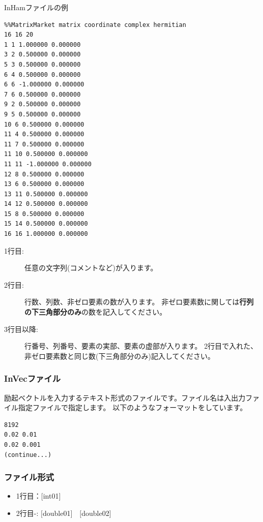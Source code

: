 \documentclass[12pt,titlepage]{jarticle}
\begin{document}
InHamファイルの例

\begin{minipage}{15cm}
  \begin{screen}
\begin{verbatim}
%%MatrixMarket matrix coordinate complex hermitian
16 16 20 
1 1 1.000000 0.000000
3 2 0.500000 0.000000
5 3 0.500000 0.000000
6 4 0.500000 0.000000
6 6 -1.000000 0.000000
7 6 0.500000 0.000000
9 2 0.500000 0.000000
9 5 0.500000 0.000000
10 6 0.500000 0.000000
11 4 0.500000 0.000000
11 7 0.500000 0.000000
11 10 0.500000 0.000000
11 11 -1.000000 0.000000
12 8 0.500000 0.000000
13 6 0.500000 0.000000
13 11 0.500000 0.000000
14 12 0.500000 0.000000
15 8 0.500000 0.000000
15 14 0.500000 0.000000
16 16 1.000000 0.000000
\end{verbatim}
  \end{screen}
\end{minipage}

\begin{description}
\item[1行目:] 任意の文字列(コメントなど)が入ります。
\item[2行目:] 行数、列数、非ゼロ要素の数が入ります。
  非ゼロ要素数に関しては{\bf 行列の下三角部分のみ}の数を記入してください。
\item[3行目以降:] 行番号、列番号、要素の実部、要素の虚部が入ります。
  2行目で入れた、非ゼロ要素数と同じ数(下三角部分のみ)記入してください。
\end{description}

\subsubsection{InVecファイル}\label{subsubsec:vec}
励起ベクトルを入力するテキスト形式のファイルです。ファイル名は入出力ファイル指定ファイルで指定します。
以下のようなフォーマットをしています。
\\
\begin{minipage}{10cm}
\begin{screen}
\begin{verbatim}
8192
0.02 0.01
0.02 0.001
(continue...)
\end{verbatim}
\end{screen}
\end{minipage}


\subsubsection{ファイル形式}
\begin{itemize}
\item  1行目：$[$int01$]$
\item  2行目-: $[$double01$]$~~$[$double02$]$
\end{itemize}
\end{document}
